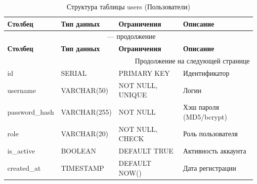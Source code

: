 \documentclass[14pt, a4paper]{extreport}
\begin{document}
\begin{longtable}{p{3cm} p{3cm} p{4cm} p{4.5cm}}
\caption{Структура таблицы users (Пользователи)} \\
\toprule
\textbf{Столбец} & \textbf{Тип данных} & \textbf{Ограничения} & \textbf{Описание} \\
\midrule
\endfirsthead
\multicolumn{4}{c}{{\tablename\ \thetable{} --- продолжение}} \\
\toprule
\textbf{Столбец} & \textbf{Тип данных} & \textbf{Ограничения} & \textbf{Описание} \\
\midrule
\endhead
\midrule
\multicolumn{4}{r}{{Продолжение на следующей странице}} \\
\endfoot
\bottomrule
\endlastfoot
id & SERIAL & PRIMARY KEY & Идентификатор \\
username & VARCHAR(50) & NOT NULL, UNIQUE & Логин \\
password\_hash & VARCHAR(255) & NOT NULL & Хэш пароля (MD5/bcrypt) \\
role & VARCHAR(20) & NOT NULL, CHECK & Роль пользователя \\
is\_active & BOOLEAN & DEFAULT TRUE & Активность аккаунта \\
created\_at & TIMESTAMP & DEFAULT NOW() & Дата регистрации \\
\end{longtable}
\end{document}

